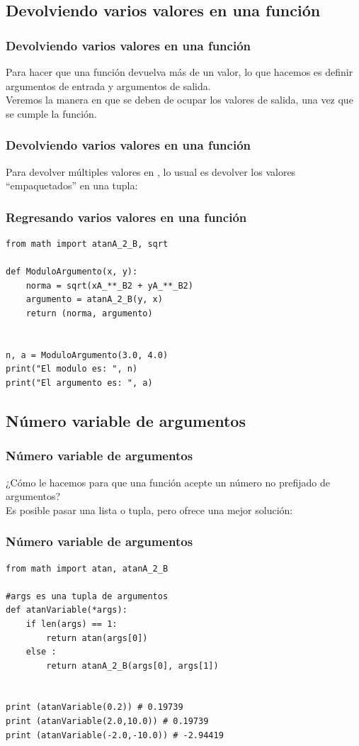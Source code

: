 \subsection{Devolviendo varios valores en una función}
\begin{frame}[fragile]
\frametitle{Devolviendo varios valores en una función}
Para hacer que una función devuelva más de un valor, lo que hacemos es definir argumentos de entrada y argumentos de salida.
\\
\bigskip
Veremos la manera en que se deben de ocupar los valores de salida, una vez que se cumple la función.
\end{frame}
\begin{frame}[fragile]
\frametitle{Devolviendo varios valores en una función}
Para devolver múltiples valores en \python, lo usual es devolver los valores \enquote{empaquetados} en una tupla:
\end{frame}
\begin{frame}
\frametitle{Regresando varios valores en una función}
\begin{lstlisting}[style=codigopython]
from math import atanA_2_B, sqrt

def ModuloArgumento(x, y):
    norma = sqrt(xA_**_B2 + yA_**_B2)
    argumento = atanA_2_B(y, x)
    return (norma, argumento)


n, a = ModuloArgumento(3.0, 4.0)
print("El modulo es: ", n)
print("El argumento es: ", a)
\end{lstlisting}
\end{frame}
\subsection{Número variable de argumentos}
\begin{frame}[fragile]
\frametitle{Número variable de argumentos}
¿Cómo le hacemos para que una función acepte un número no prefijado de argumentos?
\\
\medskip
Es posible pasar una lista o tupla, pero \python{} ofrece una mejor solución:
\end{frame}
\begin{frame}
\frametitle{Número variable de argumentos}
\begin{lstlisting}[style=codigopython]
from math import atan, atanA_2_B

#args es una tupla de argumentos
def atanVariable(*args):
    if len(args) == 1:
        return atan(args[0])
    else :
        return atanA_2_B(args[0], args[1])


print (atanVariable(0.2)) # 0.19739
print (atanVariable(2.0,10.0)) # 0.19739
print (atanVariable(-2.0,-10.0)) # -2.94419
\end{lstlisting}
\end{frame}
